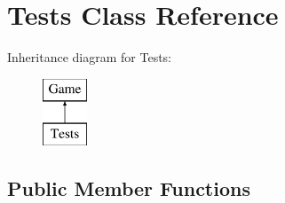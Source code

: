 \hypertarget{classTests}{\section{Tests Class Reference}
\label{classTests}
}
Inheritance diagram for Tests\+:\begin{figure}[H]
\begin{center}
\leavevmode
\includegraphics[height=2.000000cm]{classTests}
\end{center}
\end{figure}
\subsection*{Public Member Functions}

